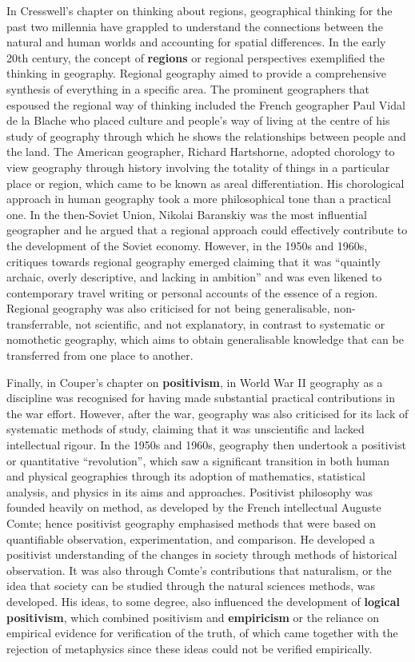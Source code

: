 \documentclass[a4paper, 10.5pt]{article} %
\begin{document}
In Cresswell's chapter on thinking about regions, geographical thinking for the past two millennia have grappled to understand the connections between the natural and human worlds and accounting for spatial differences. In the early 20th century, the concept of \textbf{regions} or regional perspectives exemplified the thinking in geography. Regional geography aimed to provide a comprehensive synthesis of everything in a specific area. The prominent geographers that espoused the regional way of thinking included the French geographer Paul Vidal de la Blache who placed culture and people's way of living at the centre of his study of geography through which he shows the relationships between people and the land. The American geographer, Richard Hartshorne, adopted chorology to view geography through history involving the totality of things in a particular place or region, which came to be known as areal differentiation. His chorological approach in human geography took a more philosophical tone than a practical one. In the then-Soviet Union, Nikolai Baranskiy was the most influential geographer and he argued that a regional approach could effectively contribute to the development of the Soviet economy. However, in the 1950s and 1960s, critiques towards regional geography emerged claiming that it was \enquote{quaintly archaic, overly descriptive, and lacking in ambition} and was even likened to contemporary travel writing or personal accounts of the essence of a region. Regional geography was also criticised for not being generalisable, non-transferrable, not scientific, and not explanatory, in contrast to systematic or nomothetic geography, which aims to obtain generalisable knowledge that can be transferred from one place to another.

Finally, in Couper's chapter on \textbf{positivism}, in World War II geography as a discipline was recognised for having made substantial practical contributions in the war effort. However, after the war, geography was also criticised for its lack of systematic methods of study, claiming that it was unscientific and lacked intellectual rigour. In the 1950s and 1960s, geography then undertook a positivist or quantitative \enquote{revolution}, which saw a significant transition in both human and physical geographies through its adoption of mathematics, statistical analysis, and physics in its aims and approaches. Positivist philosophy was founded heavily on method, as developed by the French intellectual Auguste Comte; hence positivist geography emphasised methods that were based on quantifiable observation, experimentation, and comparison. He developed a positivist understanding of the changes in society through methods of historical observation. It was also through Comte's contributions that naturalism, or the idea that society can be studied through the natural sciences methods, was developed. His ideas, to some degree, also influenced the development of \textbf{logical positivism}, which combined positivism and \textbf{empiricism} or the reliance on empirical evidence for verification of the truth, of which came together with the rejection of metaphysics since these ideas could not be verified empirically.
\end{document}
